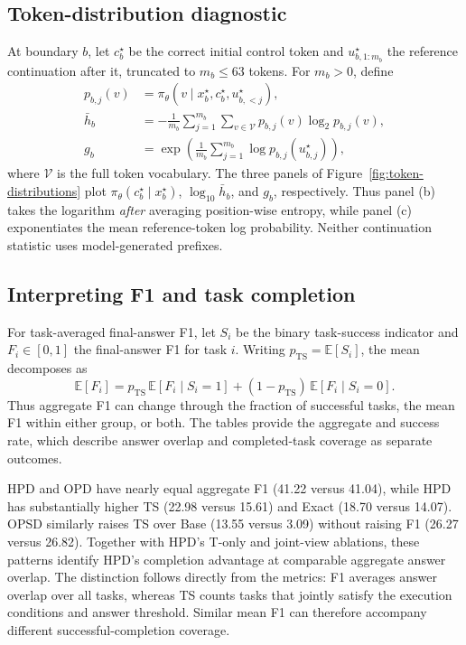 \documentclass{article}
\begin{document}
\subsection{Token-distribution diagnostic}
\label{app:token-distribution-metrics}
At boundary $b$, let $c_b^\star$ be the correct initial control token and
$u_{b,1:m_b}^\star$ the reference continuation after it, truncated to
$m_b\leq63$ tokens. For $m_b>0$, define
\begin{equation}
\begin{aligned}
p_{b,j}(v)
&=\pi_\theta(v\mid x_b^\star,c_b^\star,u_{b,<j}^\star),\\
\bar h_b
&=-\frac{1}{m_b}\sum_{j=1}^{m_b}\sum_{v\in\mathcal V}
p_{b,j}(v)\log_2 p_{b,j}(v),\\
g_b
&=\exp\!\left(\frac{1}{m_b}\sum_{j=1}^{m_b}
\log p_{b,j}(u_{b,j}^\star)\right),
\end{aligned}
\label{eq:continuation-diagnostics}
\end{equation}
where $\mathcal V$ is the full token vocabulary. The three panels of
Figure~\ref{fig:token-distributions} plot
$\pi_\theta(c_b^\star\mid x_b^\star)$, $\log_{10}\bar h_b$, and $g_b$,
respectively. Thus panel (b) takes the logarithm \emph{after} averaging
position-wise entropy, while panel (c) exponentiates the mean reference-token
log probability. Neither continuation statistic uses model-generated prefixes.

\subsection{Interpreting F1 and task completion}
\label{app:f1-interpretation}

For task-averaged final-answer F1, let $S_i$ be the binary task-success
indicator and $F_i\in[0,1]$ the final-answer F1 for task $i$. Writing
$p_{\mathrm{TS}}=\mathbb E[S_i]$, the mean decomposes as
\begin{equation}
\mathbb E[F_i]
=p_{\mathrm{TS}}\,\mathbb E[F_i\mid S_i=1]
+(1-p_{\mathrm{TS}})\,\mathbb E[F_i\mid S_i=0].
\label{eq:f1-completion-decomposition}
\end{equation}
Thus aggregate F1 can change through the fraction of successful tasks,
the mean F1 within either group, or both. The tables provide the aggregate
and success rate, which describe answer overlap and completed-task coverage
as separate outcomes.

HPD and OPD have nearly equal aggregate F1 (41.22 versus 41.04), while HPD
has substantially higher TS (22.98 versus 15.61) and Exact (18.70 versus
14.07). OPSD similarly raises TS over Base (13.55 versus 3.09)
without raising F1 (26.27 versus 26.82). Together with HPD's T-only and
joint-view ablations, these patterns identify HPD's completion advantage at
comparable aggregate answer overlap. The distinction follows directly from
the metrics: F1 averages answer overlap over all tasks, whereas TS counts
tasks that jointly satisfy the execution conditions and answer threshold.
Similar mean F1 can therefore accompany different successful-completion
coverage.
\end{document}
